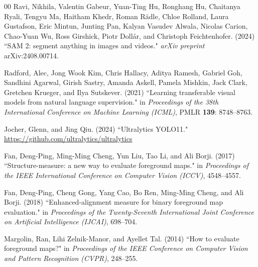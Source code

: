 \documentclass[3p,times,procedia]{elsarticle}
\begin{document}
\begin{thebibliography}{00}
{R}avi, Nikhila, Valentin Gabeur, Yuan-Ting Hu, Ronghang Hu, Chaitanya Ryali, Tengyu Ma, Haitham Khedr, Roman R\"{a}dle, Chloe Rolland, Laura Gustafson, Eric Mintun, Junting Pan, Kalyan Vasudev Alwala, Nicolas Carion, Chao-Yuan Wu, Ross Girshick, Piotr Doll\'{a}r, and Christoph Feichtenhofer. (2024) ``SAM 2: segment anything in images and videos." {\it arXiv preprint} arXiv:2408.00714.

{R}adford, Alec, Jong Wook Kim, Chris Hallacy, Aditya Ramesh, Gabriel Goh, Sandhini Agarwal, Girish Sastry, Amanda Askell, Pamela Mishkin, Jack Clark, Gretchen Krueger, and Ilya Sutskever. (2021) ``Learning transferable visual models from natural language supervision." in {\it Proceedings of the 38th International Conference on Machine Learning (ICML)}, PMLR {\bf 139}: 8748--8763.

{J}ocher, Glenn, and Jing Qiu. (2024) ``Ultralytics YOLO11." \url{https://github.com/ultralytics/ultralytics}

{F}an, Deng-Ping, Ming-Ming Cheng, Yun Liu, Tao Li, and Ali Borji. (2017) ``Structure-measure: a new way to evaluate foreground maps." in {\it Proceedings of the IEEE International Conference on Computer Vision (ICCV)}, 4548--4557.

{F}an, Deng-Ping, Cheng Gong, Yang Cao, Bo Ren, Ming-Ming Cheng, and Ali Borji. (2018) ``Enhanced-alignment measure for binary foreground map evaluation." in {\it Proceedings of the Twenty-Seventh International Joint Conference on Artificial Intelligence (IJCAI)}, 698--704.

{M}argolin, Ran, Lihi Zelnik-Manor, and Ayellet Tal. (2014) ``How to evaluate foreground maps?" in {\it Proceedings of the IEEE Conference on Computer Vision and Pattern Recognition (CVPR)}, 248--255.

\end{thebibliography}
\end{document}
